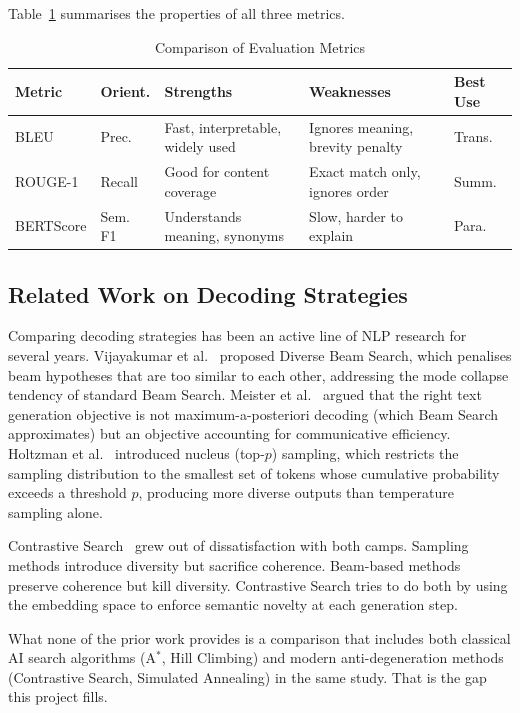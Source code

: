 \documentclass[12pt]{article}
\begin{document}
	Table~\ref{tab:metrics_compare} summarises the properties of all three metrics.
	
\begin{table}[ht]
	\centering
	\caption{Comparison of Evaluation Metrics}
	\label{tab:metrics_compare}
	\footnotesize
	\setlength{\tabcolsep}{3pt}
	\begin{tabularx}{\linewidth}{|l|l|X|X|l|}
		\hline
		\textbf{Metric} & \textbf{Orient.} & \textbf{Strengths} & \textbf{Weaknesses} & \textbf{Best Use} \\ \hline
		BLEU & Prec. & Fast, interpretable, widely used & Ignores meaning, brevity penalty & Trans. \\ \hline
		ROUGE-1 & Recall & Good for content coverage & Exact match only, ignores order & Summ. \\ \hline
		BERTScore & Sem. F1 & Understands meaning, synonyms & Slow, harder to explain & Para. \\ \hline
	\end{tabularx}
\end{table}

	\subsection{Related Work on Decoding Strategies}
	
	Comparing decoding strategies has been an active line of NLP research for several years. Vijayakumar et al.~\cite{vijayakumar2018diverse} proposed Diverse Beam Search, which penalises beam hypotheses that are too similar to each other, addressing the mode collapse tendency of standard Beam Search. Meister et al.~\cite{meister2020beam} argued that the right text generation objective is not maximum-a-posteriori decoding (which Beam Search approximates) but an objective accounting for communicative efficiency. Holtzman et al.~\cite{holtzman2020curious} introduced nucleus (top-$p$) sampling, which restricts the sampling distribution to the smallest set of tokens whose cumulative probability exceeds a threshold $p$, producing more diverse outputs than temperature sampling alone.
	
	Contrastive Search~\cite{su2022contrastive, su2023contrastive_tacl} grew out of dissatisfaction with both camps. Sampling methods introduce diversity but sacrifice coherence. Beam-based methods preserve coherence but kill diversity. Contrastive Search tries to do both by using the embedding space to enforce semantic novelty at each generation step.
	
	What none of the prior work provides is a comparison that includes both classical AI search algorithms (A$^*$, Hill Climbing) and modern anti-degeneration methods (Contrastive Search, Simulated Annealing) in the same study. That is the gap this project fills.
	
\end{document}
